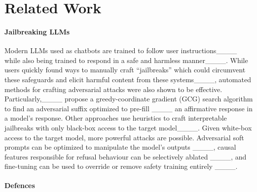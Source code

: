 \section{Related Work}

\paragraph{Jailbreaking LLMs}

Modern LLMs used as chatbots are trained to follow user instructions____ while also being trained to respond in a safe and harmless manner____.
While users quickly found ways to manually craft ``jailbreaks'' which could circumvent these safeguards and elicit harmful content from these systems____, automated methods for crafting adversarial attacks were also shown to be effective.
Particularly,____ propose a greedy-coordinate gradient (GCG) search algorithm to find an adversarial suffix optimized to pre-fill ____ an affirmative response in a model's response. 
Other approaches use heuristics to craft interpretable jailbreaks with only black-box access to the target model____.
Given white-box access to the target model, more powerful attacks are possible.
Adversarial soft prompts can be optimized to manipulate the model’s outputs ____, causal features responsible for refusal behaviour can be selectively ablated ____, and fine-tuning can be used to override or remove safety training entirely ____. 


\paragraph{Defences}


